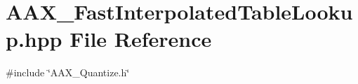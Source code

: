 \hypertarget{a00761}{}\section{A\+A\+X\+\_\+\+Fast\+Interpolated\+Table\+Lookup.\+hpp File Reference}
\label{a00761}
{\ttfamily \#include \char`\"{}A\+A\+X\+\_\+\+Quantize.\+h\char`\"{}}\newline
